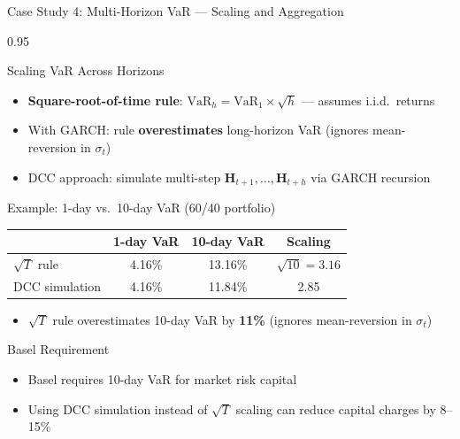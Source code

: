 \documentclass[9pt, aspectratio=169, t]{beamer}
\begin{document}
\begin{frame}{Case Study 4: Multi-Horizon VaR --- Scaling and Aggregation}
    \begin{cminipage}{0.95\textwidth}
    {\footnotesize
    \begin{block}{Scaling VaR Across Horizons}
        \begin{itemize}\setlength{\itemsep}{0pt}
            \item \textbf{Square-root-of-time rule}: $\text{VaR}_h = \text{VaR}_1 \times \sqrt{h}$ --- assumes i.i.d.\ returns
            \item With GARCH: rule \textbf{overestimates} long-horizon VaR (ignores mean-reversion in $\sigma_t$)
            \item DCC approach: simulate multi-step $\mathbf{H}_{t+1}, \ldots, \mathbf{H}_{t+h}$ via GARCH recursion
        \end{itemize}
    \end{block}
    \vspace{-2mm}
    \begin{exampleblock}{Example: 1-day vs.\ 10-day VaR (60/40 portfolio)}
        {\small
        \begin{center}
        \begin{tabular}{l|cc|c}
            \hline
            & \textbf{1-day VaR} & \textbf{10-day VaR} & \textbf{Scaling} \\
            \hline
            $\sqrt{T}$ rule & 4.16\% & 13.16\% & $\sqrt{10} = 3.16$ \\
            DCC simulation  & 4.16\% & 11.84\% & 2.85 \\
            \hline
        \end{tabular}
        \end{center}
        }
        \vspace{-2mm}
        \begin{itemize}\setlength{\itemsep}{0pt}
            \item $\sqrt{T}$ rule overestimates 10-day VaR by \textbf{11\%} (ignores mean-reversion in $\sigma_t$)
        \end{itemize}
    \end{exampleblock}
    \vspace{-3mm}
    \begin{alertblock}{Basel Requirement}
        \begin{itemize}\setlength{\itemsep}{0pt}
            \item Basel requires 10-day VaR for market risk capital
            \item Using DCC simulation instead of $\sqrt{T}$ scaling can reduce capital charges by 8--15\%
        \end{itemize}
    \end{alertblock}
    }
    \end{cminipage}
\end{frame}
\end{document}
